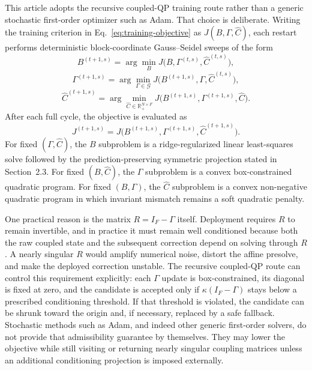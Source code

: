 \documentclass[a4paper,fleqn]{cas-sc}
\newenvironment{currentrevblock}{\begingroup\color{currentRevisionBlue}}{\endgroup}
\newenvironment{currentrevblock}{}{}
\newenvironment{revblock}{}{}
\newenvironment{revblockr127}{}{}
\begin{document}
\begin{revblock}
\begin{revblockr127}
This article adopts the recursive coupled-QP training route rather than a generic stochastic first-order optimizer such as Adam. That choice is deliberate. Writing the training criterion in Eq.~\eqref{eq:training-objective} as $J(B,\Gamma,\widehat{C})$, each restart performs deterministic block-coordinate Gauss--Seidel sweeps of the form
\begin{equation}
\label{eq:recursive-update-b}
B^{(t+1,s)} = \arg\min_{B} J\bigl(B, \Gamma^{(t,s)}, \widehat{C}^{(t,s)}\bigr),
\end{equation}
\begin{equation}
\label{eq:recursive-update-gamma}
\Gamma^{(t+1,s)} = \arg\min_{\Gamma \in \mathcal{G}} J\bigl(B^{(t+1,s)}, \Gamma, \widehat{C}^{(t,s)}\bigr),
\end{equation}
\begin{equation}
\label{eq:recursive-update-chat}
\widehat{C}^{(t+1,s)} = \arg\min_{\widehat{C} \in \mathbb{R}_{+}^{N \times F}} J\bigl(B^{(t+1,s)}, \Gamma^{(t+1,s)}, \widehat{C}\bigr).
\end{equation}
After each full cycle, the objective is evaluated as
\begin{equation}
\label{eq:recursive-update-objective}
J^{(t+1,s)} = J\bigl(B^{(t+1,s)}, \Gamma^{(t+1,s)}, \widehat{C}^{(t+1,s)}\bigr).
\end{equation}
\begin{currentrevblock}
For fixed $(\Gamma, \widehat{C})$, the $B$ subproblem is a ridge-regularized linear least-squares solve followed by the prediction-preserving symmetric projection stated in Section~2.3. For fixed $(B, \widehat{C})$, the $\Gamma$ subproblem is a convex box-constrained quadratic program. For fixed $(B, \Gamma)$, the $\widehat{C}$ subproblem is a convex non-negative quadratic program in which invariant mismatch remains a soft quadratic penalty.
\end{currentrevblock}

One practical reason is the matrix $R = I_F - \Gamma$ itself. Deployment requires $R$ to remain invertible, and in practice it must remain well conditioned because both the raw coupled state and the subsequent correction depend on solving through $R$. A nearly singular $R$ would amplify numerical noise, distort the affine presolve, and make the deployed correction unstable. The recursive coupled-QP route can control this requirement explicitly: each $\Gamma$ update is box-constrained, its diagonal is fixed at zero, and the candidate is accepted only if $\kappa(I_F - \Gamma)$ stays below a prescribed conditioning threshold. If that threshold is violated, the candidate can be shrunk toward the origin and, if necessary, replaced by a safe fallback. Stochastic methods such as Adam, and indeed other generic first-order solvers, do not provide that admissibility guarantee by themselves. They may lower the objective while still visiting or returning nearly singular coupling matrices unless an additional conditioning projection is imposed externally.


\end{revblockr127}
\end{revblock}
\end{document}
